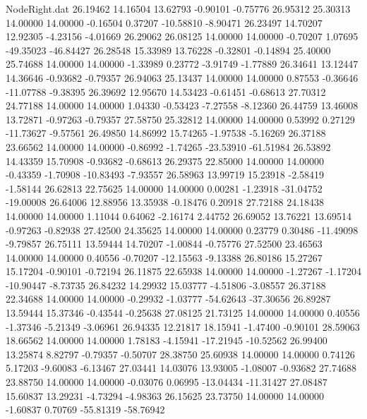 \begin{filecontents}{NodeRight.dat}
  26.19462   14.16504   13.62793    -0.90101   -0.75776   26.95312   25.30313   14.00000   14.00000   -0.16504    0.37207  -10.58810   -8.90471
  26.23497   14.70207   12.92305    -4.23156   -4.01669   26.29062   26.08125   14.00000   14.00000   -0.70207    1.07695  -49.35023  -46.84427
  26.28548   15.33989   13.76228    -0.32801   -0.14894   25.40000   25.74688   14.00000   14.00000   -1.33989    0.23772   -3.91749   -1.77889
  26.34641   13.12447   14.36646    -0.93682   -0.79357   26.94063   25.13437   14.00000   14.00000    0.87553   -0.36646  -11.07788   -9.38395
  26.39692   12.95670   14.53423    -0.61451   -0.68613   27.70312   24.77188   14.00000   14.00000    1.04330   -0.53423   -7.27558   -8.12360
  26.44759   13.46008   13.72871    -0.97263   -0.79357   27.58750   25.32812   14.00000   14.00000    0.53992    0.27129  -11.73627   -9.57561
  26.49850   14.86992   15.74265    -1.97538   -5.16269   26.37188   23.66562   14.00000   14.00000   -0.86992   -1.74265  -23.53910  -61.51984
  26.53892   14.43359   15.70908    -0.93682   -0.68613   26.29375   22.85000   14.00000   14.00000   -0.43359   -1.70908  -10.83493   -7.93557
  26.58963   13.99719   15.23918    -2.58419   -1.58144   26.62813   22.75625   14.00000   14.00000    0.00281   -1.23918  -31.04752  -19.00008
  26.64006   12.88956   13.35938    -0.18476    0.20918   27.72188   24.18438   14.00000   14.00000    1.11044    0.64062   -2.16174    2.44752
  26.69052   13.76221   13.69514    -0.97263   -0.82938   27.42500   24.35625   14.00000   14.00000    0.23779    0.30486  -11.49098   -9.79857
  26.75111   13.59444   14.70207    -1.00844   -0.75776   27.52500   23.46563   14.00000   14.00000    0.40556   -0.70207  -12.15563   -9.13388
  26.80186   15.27267   15.17204    -0.90101   -0.72194   26.11875   22.65938   14.00000   14.00000   -1.27267   -1.17204  -10.90447   -8.73735
  26.84232   14.29932   15.03777    -4.51806   -3.08557   26.37188   22.34688   14.00000   14.00000   -0.29932   -1.03777  -54.62643  -37.30656
  26.89287   13.59444   15.37346    -0.43544   -0.25638   27.08125   21.73125   14.00000   14.00000    0.40556   -1.37346   -5.21349   -3.06961
  26.94335   12.21817   18.15941    -1.47400   -0.90101   28.59063   18.66562   14.00000   14.00000    1.78183   -4.15941  -17.21945  -10.52562
  26.99400   13.25874    8.82797    -0.79357   -0.50707   28.38750   25.60938   14.00000   14.00000    0.74126    5.17203   -9.60083   -6.13467
  27.03441   14.03076   13.93005    -1.08007   -0.93682   27.74688   23.88750   14.00000   14.00000   -0.03076    0.06995  -13.04434  -11.31427
  27.08487   15.60837   13.29231    -4.73294   -4.98363   26.15625   23.73750   14.00000   14.00000   -1.60837    0.70769  -55.81319  -58.76942

\end{filecontents}
